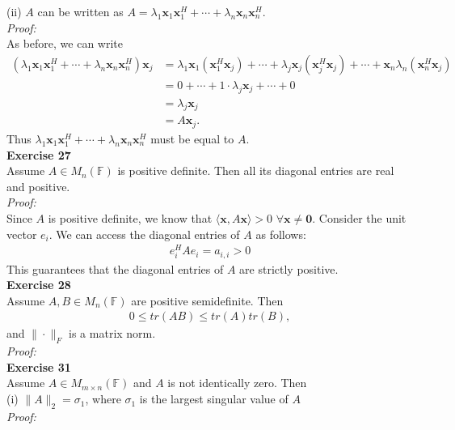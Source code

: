 \documentclass[letterpaper,12pt]{article}
\let\vec\mathbf
\theoremstyle{definition}
\begin{document}
(ii) $A$ can be written as $A = \lambda_1 \vec{x}_1 \vec{x}_1^H + \cdots + \lambda_n \vec{x}_n \vec{x}_n^H$. \\
\textit{Proof:} \\
As before, we can write
\begin{align*}
  (\lambda_1 \vec{x}_1 \vec{x}_1^H + \cdots + \lambda_n \vec{x}_n \vec{x}_n^H)\vec{x}_j
  &= \lambda_1 \vec{x}_1 (\vec{x}_1^H \vec{x}_j) + \cdots + \lambda_j \vec{x}_j (\vec{x}_j^H \vec{x}_j) + \cdots + \vec{x}_n \lambda_n (\vec{x}_n^H \vec{x}_j) \\
  &= 0 + \cdots + 1 \cdot \lambda_j \vec{x}_j + \cdots + 0 \\
  &= \lambda_j \vec{x}_j \\
  &= A \vec{x}_j.
\end{align*}
Thus $\lambda_1 \vec{x}_1 \vec{x}_1^H + \cdots + \lambda_n \vec{x}_n \vec{x}_n^H$ must be equal to $A$. \\

\textbf{Exercise 27} \\
Assume $A \in M_n(\mathbb{F})$ is positive definite. Then all its diagonal entries are real and positive. \\
\textit{Proof:} \\
Since $A$ is positive definite, we know that $\langle \vec{x}, A\vec{x} \rangle > 0$ $\forall \vec{x} \neq \vec{0}$. Consider the unit vector $e_i$. We can access the diagonal entries of $A$ as follows:
\begin{align*}
  e_i^H A e_i = a_{i,i} > 0
\end{align*}
This guarantees that the diagonal entries of $A$ are strictly positive. \\

\textbf{Exercise 28} \\
Assume $A, B \in M_n(\mathbb{F})$ are positive semidefinite. Then
\begin{align*}
  0 \leq tr(AB) \leq tr(A) tr(B),
\end{align*}
and $\|\cdot\|_F$ is a matrix norm. \\
\textit{Proof:} \\


\textbf{Exercise 31} \\
Assume $A \in M_{m \times n}(\mathbb{F})$ and $A$ is not identically zero. Then \\
(i) $\|A\|_2 = \sigma_1$, where $\sigma_1$ is the largest singular value of $A$ \\
\textit{Proof:} \\
\end{document}
